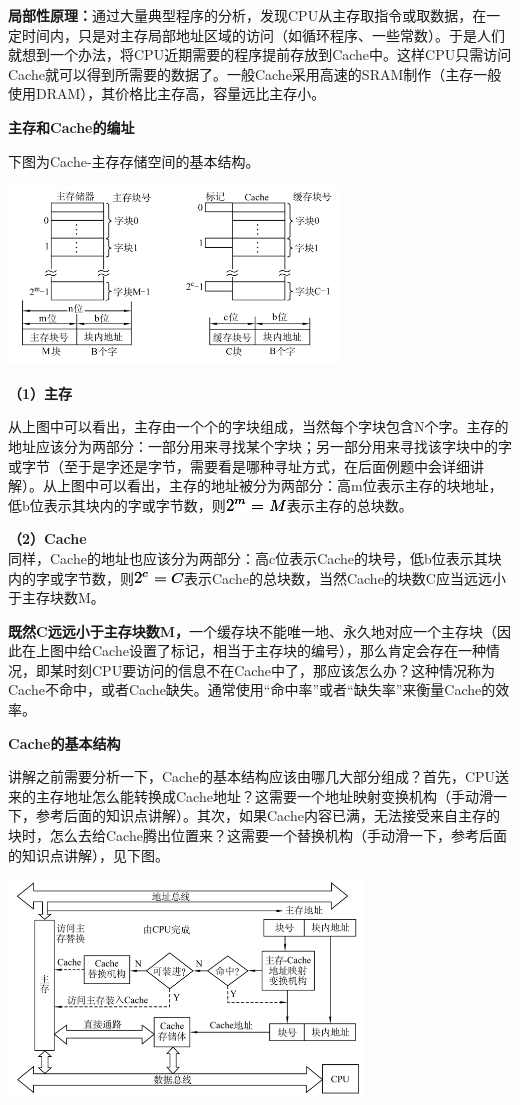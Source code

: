 \textbf{{局部性原理：}}通过大量典型程序的分析，发现CPU从主存取指令或取数据，在一定时间内，只是对主存局部地址区域的访问（如循环程序、一些常数）。于是人们就想到一个办法，将CPU近期需要的程序提前存放到Cache中。这样CPU只需访问Cache就可以得到所需要的数据了。一般Cache采用高速的SRAM制作（主存一般使用DRAM），其价格比主存高，容量远比主存小。

\textbf{{主存和Cache的编址}}

下图为Cache-主存存储空间的基本结构。

\includegraphics[width=3.46875in,height=1.87500in]{png-jpeg-pics/DE7334A86E795B5566B1263B7DE9D037.png}

\textbf{（1）主存}

从上图中可以看出，主存由一个个的字块组成，当然每个字块包含N个字。主存的地址应该分为两部分：{一部分用来寻找某个字块；另一部分用来寻找该字块中的字或字节}（至于是字还是字节，需要看是哪种寻址方式，在后面例题中会详细讲解）。从上图中可以看出，主存的地址被分为两部分：高m位表示主存的块地址，低b位表示其块内的字或字节数，则\includegraphics[width=0.63542in,height=0.12500in]{texmath/71ef852mM}表示主存的总块数。

\textbf{（2）Cache}\\
同样，Cache的地址也应该分为两部分：高c位表示Cache的块号，低b位表示其块内的字或字节数，则\includegraphics[width=0.52083in,height=0.12500in]{texmath/69348f2cC}表示Cache的总块数，当然Cache的块数C应当远远小于主存块数M。

\textbf{既然C远远小于主存块数M，}一个缓存块不能唯一地、永久地对应一个主存块（因此在上图中给Cache设置了标记，相当于主存块的编号），那么肯定会存在一种情况，即某时刻CPU要访问的信息不在Cache中了，那应该怎么办？这种情况称为Cache不命中，或者Cache缺失。通常使用``命中率''或者``缺失率''来衡量Cache的效率。

\textbf{{Cache的基本结构}}

讲解之前需要分析一下，Cache的基本结构应该由哪几大部分组成？首先，CPU送来的主存地址怎么能转换成Cache地址？这需要一个地址映射变换机构（手动滑一下，参考后面的知识点讲解）。其次，如果Cache内容已满，无法接受来自主存的块时，怎么去给Cache腾出位置来？这需要一个替换机构{（手动滑一下，参考后面的知识点讲解），见下图}。

\includegraphics[width=3.69792in,height=2.27083in]{png-jpeg-pics/DE4E63B93B4FDC207CE889BDCC0EAD7A.png}
